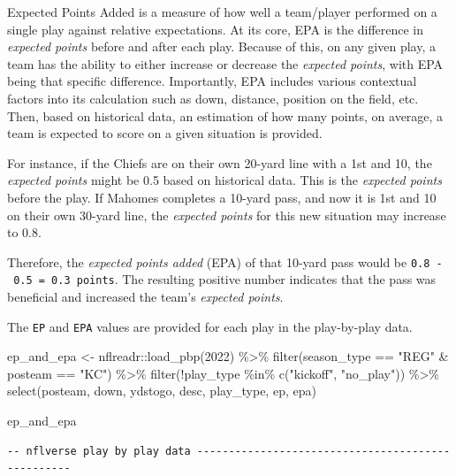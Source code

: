\documentclass[
  letterpaper,
]{krantz}
\newenvironment{Shaded}{\begin{snugshade}}{\end{snugshade}}
\newcommand{\DecValTok}[1]{\textcolor[rgb]{0.68,0.00,0.00}{#1}}
\newcommand{\FunctionTok}[1]{\textcolor[rgb]{0.28,0.35,0.67}{#1}}
\newcommand{\NormalTok}[1]{\textcolor[rgb]{0.00,0.23,0.31}{#1}}
\newcommand{\OtherTok}[1]{\textcolor[rgb]{0.00,0.23,0.31}{#1}}
\newcommand{\SpecialCharTok}[1]{\textcolor[rgb]{0.37,0.37,0.37}{#1}}
\newcommand{\StringTok}[1]{\textcolor[rgb]{0.13,0.47,0.30}{#1}}
\begin{document}
Expected Points Added is a measure of how well a team/player performed
on a single play against relative expectations. At its core, EPA is the
difference in \emph{expected points} before and after each play. Because
of this, on any given play, a team has the ability to either increase or
decrease the \emph{expected points}, with EPA being that specific
difference. Importantly, EPA includes various contextual factors into
its calculation such as down, distance, position on the field, etc.
Then, based on historical data, an estimation of how many points, on
average, a team is expected to score on a given situation is provided.

For instance, if the Chiefs are on their own 20-yard line with a 1st and
10, the \emph{expected points} might be 0.5 based on historical data.
This is the \emph{expected points} before the play. If Mahomes completes
a 10-yard pass, and now it is 1st and 10 on their own 30-yard line, the
\emph{expected points} for this new situation may increase to 0.8.

Therefore, the \emph{expected points added} (EPA) of that 10-yard pass
would be \texttt{0.8\ -\ 0.5\ =\ 0.3\ points}. The resulting positive
number indicates that the pass was beneficial and increased the team's
\emph{expected points}.

The \texttt{EP} and \texttt{EPA} values are provided for each play in
the play-by-play data.

\begin{Shaded}
\begin{Highlighting}[]
\NormalTok{ep\_and\_epa }\OtherTok{\textless{}{-}}\NormalTok{ nflreadr}\SpecialCharTok{::}\FunctionTok{load\_pbp}\NormalTok{(}\DecValTok{2022}\NormalTok{) }\SpecialCharTok{\%\textgreater{}\%}
  \FunctionTok{filter}\NormalTok{(season\_type }\SpecialCharTok{==} \StringTok{"REG"} \SpecialCharTok{\&}\NormalTok{ posteam }\SpecialCharTok{==} \StringTok{"KC"}\NormalTok{) }\SpecialCharTok{\%\textgreater{}\%}
  \FunctionTok{filter}\NormalTok{(}\SpecialCharTok{!}\NormalTok{play\_type }\SpecialCharTok{\%in\%} \FunctionTok{c}\NormalTok{(}\StringTok{"kickoff"}\NormalTok{, }\StringTok{"no\_play"}\NormalTok{)) }\SpecialCharTok{\%\textgreater{}\%}
  \FunctionTok{select}\NormalTok{(posteam, down, ydstogo, desc, play\_type, ep, epa)}

\NormalTok{ep\_and\_epa}
\end{Highlighting}
\end{Shaded}

\begin{verbatim}
-- nflverse play by play data --------------------------------------------------
\end{verbatim}
\end{document}
